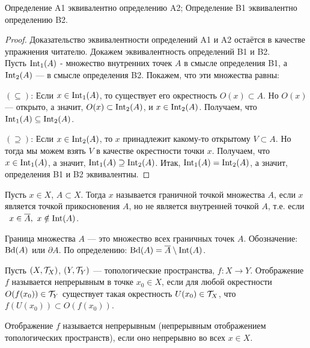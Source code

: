 \begin{theorem} %
    Определение A1 эквивалентно определению A2; Определение B1 эквивалентно определению B2.
\end{theorem}
\begin{proof}
    Доказательство эквивалентности определений A1 и A2 остаётся в качестве упражнения читателю.
    Докажем эквивалентность определений B1 и B2. \\
    Пусть $\operatorname{Int}_1(A)$ - множество внутренних точек $A$ в смысле определения B1, а $\operatorname{Int}_2(A)$ --- в смысле определения B2. Покажем, что эти множества равны:

    $(\subseteq)$: Если $x \in \operatorname{Int}_1(A)$, то существует его окрестность $O(x) \subset A$. Но $O(x)$ --- открыто, а значит, $O(x) \subset \operatorname{Int}_2(A)$, и $x \in \operatorname{Int}_2(A)$. Получаем, что $\operatorname{Int}_1(A) \subseteq \operatorname{Int}_2(A)$.
    
    $(\supseteq)$: Если $x \in \operatorname{Int}_2(A)$, то $x$ принадлежит какому-то открытому $V \subset A$. Но тогда мы можем взять $V$ в качестве окрестности точки $x$. Получаем, что $x \in \operatorname{Int}_1(A)$, а значит, $\operatorname{Int}_1(A) \supseteq \operatorname{Int}_2(A)$.
    Итак, $\operatorname{Int}_1(A) = \operatorname{Int}_2(A)$, а значит, определения B1 и B2 эквивалентны.
\end{proof}

\begin{definition}
    Пусть $x \in X$, $A \subset X$. Тогда $x$ называется граничной точкой множества $A$, если $x$ является точкой прикосновения $A$, но не является внутренней точкой $A$, т.е. если \ $x \in \overline{A}, \ x \notin \operatorname{Int}(A)$.
\end{definition}

\begin{definition}
    Граница множества $A$ --- это множество всех граничных точек $A$. Обозначение: $\operatorname{Bd}(A)$ или $\partial A$.
    По определению: $\operatorname{Bd}(A) = \overline{A} \setminus \operatorname{Int}(A)$.
\end{definition}

\begin{definition}
    Пусть $(X, \mathcal{T}_{X})$, $(Y, \mathcal{T}_{Y})$ --- топологические пространства, $f: X \rightarrow Y$. Отображение $f$ называется непрерывным в точке $x_0 \in X$, если для любой окрестности $O(f(x_0)) \in \mathcal{T}_{Y}$ существует такая окрестность $U(x_0) \in \mathcal{T}_{X}$, что $f(U(x_0)) \subset O(f(x_0))$. 

    Отображение $f$ называется непрерывным (непрерывным отображением топологических пространств), если оно непрерывно во всех $x \in X$.
\end{definition}


